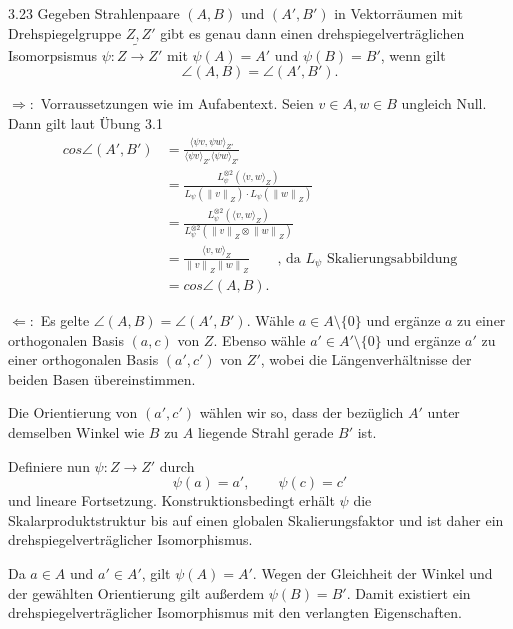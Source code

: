 \begin{exercise}{3.2}{3}
    Gegeben Strahlenpaare $(A, B)$ und $(A', B')$ in Vektorräumen mit Drehspiegelgruppe $Z, Z'$ gibt es genau dann einen
    drehspiegelverträglichen Isomorpsismus $\psi : Z \tilde \rightarrow Z'$ mit $\psi(A) = A'$ und $\psi(B) = B'$, wenn gilt
    \[\angle(A,B)=\angle(A',B').\]
\end{exercise}

$\Longrightarrow:$ Vorraussetzungen wie im Aufabentext. Seien $v \in A, w \in B$ ungleich Null. Dann gilt laut Übung 3.1 
\begin{align*}
    cos \angle(A',B') &= \frac{\langle \psi v, \psi w\rangle_{Z'}}{\langle \psi v\rangle_{Z'}\langle \psi w\rangle_{Z'}}\\
    &= \frac{L_\psi^{\otimes 2}(\langle v, w\rangle_{Z})}{L_\psi(\left\| v\right\|_{Z})\cdot L_\psi(\left\| w\right\|_{Z})}\\
    &= \frac{L_\psi^{\otimes 2}(\langle v, w\rangle_{Z})}{L_\psi^{\otimes 2}(\left\| v\right\|_{Z} \otimes \left\| w\right\|_{Z})}\\
    &= \frac{\langle v, w\rangle_Z}{\left\| v\right\|_Z\left\| w\right\|_Z} \qquad \text{, da $L_\psi$ Skalierungsabbildung}\\
    &= cos\angle (A,B).
\end{align*}

$\Longleftarrow:$ Es gelte
    \(
        \angle(A,B)=\angle(A',B')
    \).
    Wähle \(a\in A\setminus\{0\}\) und ergänze \(a\) zu einer
    orthogonalen Basis \((a,c)\) von \(Z\). Ebenso wähle
    \(a'\in A'\setminus\{0\}\) und ergänze \(a'\) zu einer
    orthogonalen Basis \((a',c')\) von \(Z'\), wobei die Längenverhältnisse
    der beiden Basen übereinstimmen.

    Die Orientierung von \((a',c')\) wählen wir so, dass der bezüglich
    \(A'\) unter demselben Winkel wie \(B\) zu \(A\) liegende Strahl
    gerade \(B'\) ist.

    Definiere nun \(\psi:Z\to Z'\) durch
    \[
        \psi(a)=a',
        \qquad
        \psi(c)=c'
    \]
    und lineare Fortsetzung. Konstruktionsbedingt erhält \(\psi\) die
    Skalarproduktstruktur bis auf einen globalen Skalierungsfaktor und ist
    daher ein drehspiegelverträglicher Isomorphismus.

    Da \(a\in A\) und \(a'\in A'\), gilt
    \(
        \psi(A)=A'
    \).
    Wegen der Gleichheit der Winkel und der gewählten Orientierung gilt
    au\ss erdem
    \(
        \psi(B)=B'
    \).
    Damit existiert ein drehspiegelverträglicher Isomorphismus mit den
    verlangten Eigenschaften.

